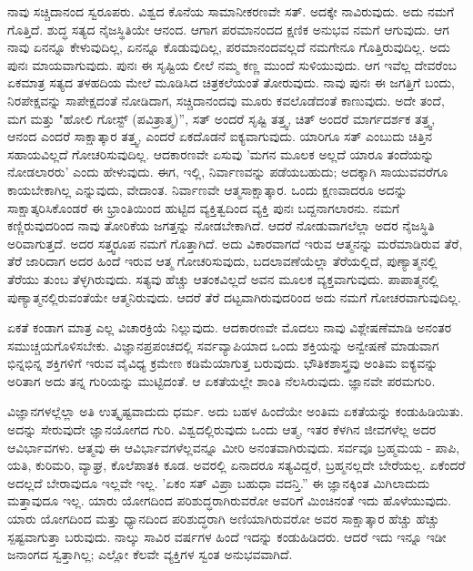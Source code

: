 ನಾವು ಸಚ್ಚಿದಾನಂದ ಸ್ವರೂಪರು. ವಿಶ್ವದ ಕೊನೆಯ ಸಾಮಾನೀಕರಣವೇ ಸತ್. ಅದಕ್ಕೇ ನಾವಿರುವುದು. ಅದು ನಮಗೆ ಗೊತ್ತಿದೆ. ಶುದ್ಧ ಸತ್ಯದ ನೈಜಸ್ಥಿತಿಯೇ ಆನಂದ. ಆಗಾಗ ಪರಮಾನಂದದ ಕ್ಷಣಿಕ ಅನುಭವ ನಮಗೆ ಆಗುವುದು. ಆಗ ನಾವು ಏನನ್ನೂ ಕೇಳುವುದಿಲ್ಲ, ಏನನ್ನೂ ಕೊಡುವುದಿಲ್ಲ, ಪರಮಾನಂದವಲ್ಲದೆ ನಮಗೇನೂ ಗೊತ್ತಿರುವುದಿಲ್ಲ. ಅದು ಪುನಃ ಮಾಯವಾಗುವುದು. ಪುನಃ ಈ ಸೃಷ್ಟಿಯ ಲೀಲೆ ನಮ್ಮ ಕಣ್ಣ ಮುಂದೆ ಸುಳಿಯುವುದು. ಆಗ ಇವೆಲ್ಲ ದೇವರೆಂಬ ಏಕಮಾತ್ರ ಸತ್ಯದ ತಳಹದಿಯ ಮೇಲೆ ಮೂಡಿಸಿದ ಚಿತ್ರಕಲೆಯಂತೆ ತೋರುವುದು. ನಾವು ಪುನಃ ಈ ಜಗತ್ತಿಗೆ ಬಂದು, ನಿರಪೇಕ್ಷವನ್ನು ಸಾಪೇಕ್ಷದಂತೆ ನೋಡಿದಾಗ, ಸಚ್ಚಿದಾನಂದವು ಮೂರು ಕವಲೊಡೆದಂತೆ ಕಾಣುವುದು. ಅದೇ ತಂದೆ, ಮಗ ಮತ್ತು "ಹೋಲಿ ಗೋಸ್ಟ್ (ಪವಿತ್ರಾತ್ಮ)'', ಸತ್ ಅಂದರೆ ಸೃಷ್ಟಿ ತತ್ತ್ವ, ಚಿತ್ ಅಂದರೆ ಮಾರ್ಗದರ್ಶಕ ತತ್ತ್ವ, ಆನಂದ ಎಂದರೆ ಸಾಕ್ಷಾತ್ಕಾರ ತತ್ತ್ವ, ಎಂದರೆ ಏಕದೊಡನೆ ಐಕ್ಯವಾಗುವುದು. ಯಾರಿಗೂ ಸತ್ ಎಂಬುದು ಚಿತ್ತಿನ ಸಹಾಯವಿಲ್ಲದೆ ಗೋಚರಿಸುವುದಿಲ್ಲ. ಆದಕಾರಣವೇ ಏಸುವು 'ಮಗನ ಮೂಲಕ ಅಲ್ಲದೆ ಯಾರೂ ತಂದೆಯನ್ನು ನೋಡಲಾರರು' ಎಂದು ಹೇಳುವುದು. ಈಗ, ಇಲ್ಲಿ, ನಿರ್ವಾಣವನ್ನು ಪಡೆಯಬಹುದು; ಅದಕ್ಕಾಗಿ ಸಾಯುವವರೆಗೂ ಕಾಯಬೇಕಾಗಿಲ್ಲ ಎನ್ನುವುದು, ವೇದಾಂತ. ನಿರ್ವಾಣವೇ ಆತ್ಮಸಾಕ್ಷಾತ್ಕಾರ. ಒಂದು ಕ್ಷಣವಾದರೂ ಅದನ್ನು ಸಾಕ್ಷಾತ್ಕರಿಸಿಕೊಂಡರೆ ಈ ಭ್ರಾಂತಿಯಿಂದ ಹುಟ್ಟಿದ ವ್ಯಕ್ತಿತ್ವದಿಂದ ವ್ಯಕ್ತಿ ಪುನಃ ಬದ್ದನಾಗಲಾರನು. ನಮಗೆ ಕಣ್ಣಿರುವುದರಿಂದ ನಾವು ತೋರಿಕೆಯ ಜಗತ್ತನ್ನು ನೋಡಬೇಕಾಗಿದೆ. ಆದರೆ ನೋಡುವಾಗಲೆಲ್ಲಾ ಅದರ ನೈಜಸ್ಥಿತಿ ಅರಿವಾಗುತ್ತದೆ. ಅದರ ಸತ್ತ್ವರೂಪ ನಮಗೆ ಗೊತ್ತಾಗಿದೆ. ಅದು ವಿಕಾರವಾಗದೆ ಇರುವ ಆತ್ಮನನ್ನು ಮರೆಮಾಡಿರುವ ತೆರೆ, ತೆರೆ ಜಾರಿದಾಗ ಅದರ ಹಿಂದೆ ಇರುವ ಆತ್ಮ ಗೋಚರಿಸುವುದು, ಬದಲಾವಣೆಯೆಲ್ಲಾ ತೆರೆಯಲ್ಲಿದೆ, ಪುಣ್ಯಾತ್ಮನಲ್ಲಿ ತೆರೆಯು ತುಂಬ ತೆಳ್ಳಗಿರುವುದು. ಸತ್ಯವು ಹೆಚ್ಚು ಆತಂಕವಿಲ್ಲದೆ ಅವನ ಮೂಲಕ ವ್ಯಕ್ತವಾಗುವುದು. ಪಾಪಾತ್ಮನಲ್ಲಿ ಪುಣ್ಯಾತ್ಮನಲ್ಲಿರುವಂತೆಯೇ ಆತ್ಮನಿರುವುದು. ಆದರೆ ತೆರೆ ದಟ್ಟವಾಗಿರುವುದರಿಂದ ಅದು ನಮಗೆ ಗೋಚರವಾಗುವುದಿಲ್ಲ.

ಏಕತೆ ಕಂಡಾಗ ಮಾತ್ರ ಎಲ್ಲ ವಿಚಾರಕ್ರಿಯೆ ನಿಲ್ಲುವುದು. ಆದಕಾರಣವೇ ಮೊದಲು ನಾವು ವಿಶ್ಲೇಷಣೆಮಾಡಿ ಅನಂತರ ಸಮುಚ್ಚಯಗೊಳಿಸಬೇಕು. ವಿಜ್ಞಾನಪ್ರಪಂಚದಲ್ಲಿ ಸರ್ವವ್ಯಾಪಿಯಾದ ಒಂದು ಶಕ್ತಿಯನ್ನು ಅನ್ವೇಷಣೆ ಮಾಡುವಾಗ ಭಿನ್ನಭಿನ್ನ ಶಕ್ತಿಗಳಿಗೆ ಇರುವ ವೈವಿಧ್ಯ ಕ್ರಮೇಣ ಕಡಿಮೆಯಾಗುತ್ತ ಬರುವುದು. ಭೌತಿಕಶಾಸ್ತ್ರವು ಅಂತಿಮ ಐಕ್ಯವನ್ನು ಅರಿತಾಗ ಅದು ತನ್ನ ಗುರಿಯನ್ನು ಮುಟ್ಟಿದಂತೆ. ಆ ಏಕತೆಯಲ್ಲೇ ಶಾಂತಿ ನೆಲಸಿರುವುದು. ಜ್ಞಾನವೇ ಪರಮಗುರಿ.

ವಿಜ್ಞಾನಗಳಲ್ಲೆಲ್ಲಾ ಅತಿ ಉತ್ಕೃಷ್ಟವಾದುದು ಧರ್ಮ. ಅದು ಬಹಳ ಹಿಂದೆಯೇ ಅಂತಿಮ ಏಕತೆಯನ್ನು ಕಂಡುಹಿಡಿಯಿತು. ಅದನ್ನು ಸೇರುವುದೇ ಜ್ಞಾನಯೋಗದ ಗುರಿ. ವಿಶ್ವದಲ್ಲಿರುವುದು ಒಂದು ಆತ್ಮ, ಇತರ ಕೆಳಗಿನ ಜೀವಗಳೆಲ್ಲ ಅದರ ಆವಿರ್ಭಾವಗಳು. ಆತ್ಮವು ಈ ಆವಿರ್ಭಾವಗಳೆಲ್ಲವನ್ನೂ ಮೀರಿ ಅನಂತವಾಗಿರುವುದು. ಸರ್ವವೂ ಬ್ರಹ್ಮಮಯ - ಪಾಪಿ, ಯತಿ, ಕುರಿಮರಿ, ವ್ಯಾಘ್ರ, ಕೊಲೆಪಾತಕಿ ಕೂಡ. ಅವರಲ್ಲಿ ಏನಾದರೂ ಸತ್ಯವಿದ್ದರೆ, ಬ್ರಹ್ಮನಲ್ಲದೇ ಬೇರೆಯಲ್ಲ. ಏಕೆಂದರೆ ಅದಲ್ಲದೆ ಬೇರಾವುದೂ ಇಲ್ಲವೇ ಇಲ್ಲ. 'ಏಕಂ ಸತ್ ವಿಪ್ರಾ ಬಹುಧಾ ವದನ್ತಿ.” ಈ ಜ್ಞಾನಕ್ಕಿಂತ ಮಿಗಿಲಾದುದು ಮತ್ತಾವುದೂ ಇಲ್ಲ. ಯಾರು ಯೋಗದಿಂದ ಪರಿಶುದ್ಧರಾಗಿರುವರೋ ಅವರಿಗೆ ಮಿಂಚಿನಂತೆ ಇದು ಹೊಳೆಯುವುದು. ಯಾರು ಯೋಗದಿಂದ ಮತ್ತು ಧ್ಯಾನದಿಂದ ಪರಿಶುದ್ಧರಾಗಿ ಅಣಿಯಾಗಿರುವರೋ ಅವರ ಸಾಕ್ಷಾತ್ಕಾರ ಹೆಚ್ಚು ಹೆಚ್ಚು ಸ್ಪಷ್ಟವಾಗುತ್ತಾ ಬರುವುದು. ನಾಲ್ಕು ಸಾವಿರ ವರ್ಷಗಳ ಹಿಂದೆ ಇದನ್ನು ಕಂಡುಹಿಡಿದರು. ಆದರೆ ಇದು ಇನ್ನೂ ಇಡೀ ಜನಾಂಗದ ಸ್ವತ್ತಾಗಿಲ್ಲ; ಎಲ್ಲೋ ಕೆಲವೇ ವ್ಯಕ್ತಿಗಳ ಸ್ವಂತ ಅನುಭವವಾಗಿದೆ.

